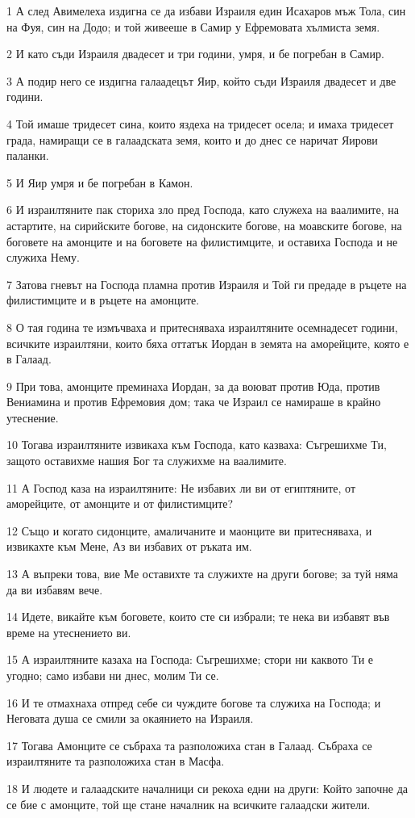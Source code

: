 \par 1 А след Авимелеха издигна се да избави Израиля един Исахаров мъж Тола, син на Фуя, син на Додо; и той живееше в Самир у Ефремовата хълмиста земя.
\par 2 И като съди Израиля двадесет и три години, умря, и бе погребан в Самир.
\par 3 А подир него се издигна галаадецът Яир, който съди Израиля двадесет и две години.
\par 4 Той имаше тридесет сина, които яздеха на тридесет осела; и имаха тридесет града, намиращи се в галаадската земя, които и до днес се наричат Яирови паланки.
\par 5 И Яир умря и бе погребан в Камон.
\par 6 И израилтяните пак сториха зло пред Господа, като служеха на ваалимите, на астартите, на сирийските богове, на сидонските богове, на моавските богове, на боговете на амонците и на боговете на филистимците, и оставиха Господа и не служиха Нему.
\par 7 Затова гневът на Господа пламна против Израиля и Той ги предаде в ръцете на филистимците и в ръцете на амонците.
\par 8 О тая година те измъчваха и притесняваха израилтяните осемнадесет години, всичките израилтяни, които бяха оттатък Иордан в земята на аморейците, която е в Галаад.
\par 9 При това, амонците преминаха Иордан, за да воюват против Юда, против Вениамина и против Ефремовия дом; така че Израил се намираше в крайно утеснение.
\par 10 Тогава израилтяните извикаха към Господа, като казваха: Съгрешихме Ти, защото оставихме нашия Бог та служихме на ваалимите.
\par 11 А Господ каза на израилтяните: Не избавих ли ви от египтяните, от аморейците, от амонците и от филистимците?
\par 12 Също и когато сидонците, амаличаните и маонците ви притесняваха, и извикахте към Мене, Аз ви избавих от ръката им.
\par 13 А въпреки това, вие Ме оставихте та служихте на други богове; за туй няма да ви избавям вече.
\par 14 Идете, викайте към боговете, които сте си избрали; те нека ви избавят във време на утеснението ви.
\par 15 А израилтяните казаха на Господа: Съгрешихме; стори ни каквото Ти е угодно; само избави ни днес, молим Ти се.
\par 16 И те отмахнаха отпред себе си чуждите богове та служиха на Господа; и Неговата душа се смили за окаянието на Израиля.
\par 17 Тогава Амонците се събраха та разположиха стан в Галаад. Събраха се израилтяните та разположиха стан в Масфа.
\par 18 И людете и галаадските началници си рекоха едни на други: Който започне да се бие с амонците, той ще стане началник на всичките галаадски жители.

